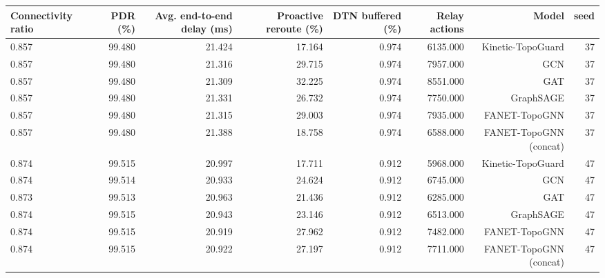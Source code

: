 \begin{tabular}{lrrrrrrr}
\toprule
Connectivity ratio & PDR (\%) & Avg. end-to-end delay (ms) & Proactive reroute (\%) & DTN buffered (\%) & Relay actions & Model & seed \\
\midrule
0.857 & 99.480 & 21.424 & 17.164 & 0.974 & 6135.000 & Kinetic-TopoGuard & 37 \\
0.857 & 99.480 & 21.316 & 29.715 & 0.974 & 7957.000 & GCN & 37 \\
0.857 & 99.480 & 21.309 & 32.225 & 0.974 & 8551.000 & GAT & 37 \\
0.857 & 99.480 & 21.331 & 26.732 & 0.974 & 7750.000 & GraphSAGE & 37 \\
0.857 & 99.480 & 21.315 & 29.003 & 0.974 & 7935.000 & FANET-TopoGNN & 37 \\
0.857 & 99.480 & 21.388 & 18.758 & 0.974 & 6588.000 & FANET-TopoGNN (concat) & 37 \\
0.874 & 99.515 & 20.997 & 17.711 & 0.912 & 5968.000 & Kinetic-TopoGuard & 47 \\
0.874 & 99.514 & 20.933 & 24.624 & 0.912 & 6745.000 & GCN & 47 \\
0.873 & 99.513 & 20.963 & 21.436 & 0.912 & 6285.000 & GAT & 47 \\
0.874 & 99.515 & 20.943 & 23.146 & 0.912 & 6513.000 & GraphSAGE & 47 \\
0.874 & 99.515 & 20.919 & 27.962 & 0.912 & 7482.000 & FANET-TopoGNN & 47 \\
0.874 & 99.515 & 20.922 & 27.197 & 0.912 & 7711.000 & FANET-TopoGNN (concat) & 47 \\
\bottomrule
\end{tabular}